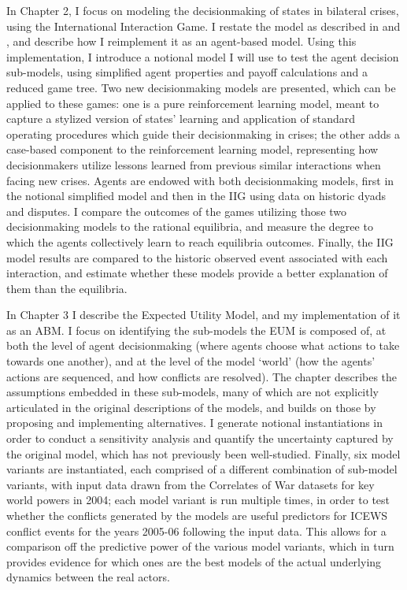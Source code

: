 In Chapter 2, I focus on modeling the decisionmaking of states in bilateral crises, using the International Interaction Game. I restate the model as described in \citet{bdm_1992} and \citet{bennett_2000}, and describe how I reimplement it as an agent-based model. Using this implementation, I introduce a notional model I will use to test the agent decision sub-models, using simplified agent properties and payoff calculations and a reduced game tree. Two new decisionmaking models are presented, which can be applied to these games: one is a pure reinforcement learning model, meant to capture a stylized version of states' learning and application of standard operating procedures which guide their decisionmaking in crises; the other adds a case-based component to the reinforcement learning model, representing how decisionmakers utilize lessons learned from previous similar interactions when facing new crises. Agents are endowed with both decisionmaking models, first in the notional simplified model and then in the IIG using data on historic dyads and disputes. I compare the outcomes of the games utilizing those two decisionmaking models to the rational equilibria, and measure the degree to which the agents collectively learn to reach equilibria outcomes. Finally, the IIG model results are compared to the historic observed event associated with each interaction, and estimate whether these models provide a better explanation of them than the equilibria.

In Chapter 3 I describe the Expected Utility Model, and my implementation of it as an ABM. I focus on identifying the sub-models the EUM is composed of, at both the level of agent decisionmaking (where agents choose what actions to take towards one another), and at the level of the model `world' (how the agents' actions are sequenced, and how conflicts are resolved). The chapter describes the assumptions embedded in these sub-models, many of which are not explicitly articulated in the original descriptions of the models, and builds on those by proposing and implementing alternatives. I generate notional instantiations in order to conduct a sensitivity analysis and quantify the uncertainty captured by the original model, which has not previously been well-studied. Finally, six model variants are instantiated, each comprised of a different combination of sub-model variants, with input data drawn from the Correlates of War datasets for key world powers in 2004; each model variant is run multiple times, in order to test whether the conflicts generated by the models are useful predictors for ICEWS conflict events for the years 2005-06 following the input data. This allows for a comparison off the predictive power of the various model variants, which in turn provides evidence for which ones are the best models of the actual underlying dynamics between the real actors.

